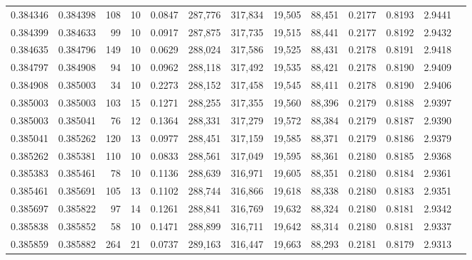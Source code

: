 \begin{tabular}{rrrrrrrrrrrrr}
0.384346 & 0.384398 &   108 &  10 &                                     0.0847 & 287,776 & 317,834 &  19,505 &  88,451 & 0.2177 & 0.8193 & 2.9441 \\
0.384399 & 0.384633 &    99 &  10 &                                     0.0917 & 287,875 & 317,735 &  19,515 &  88,441 & 0.2177 & 0.8192 & 2.9432 \\
0.384635 & 0.384796 &   149 &  10 &                                     0.0629 & 288,024 & 317,586 &  19,525 &  88,431 & 0.2178 & 0.8191 & 2.9418 \\
0.384797 & 0.384908 &    94 &  10 &                                     0.0962 & 288,118 & 317,492 &  19,535 &  88,421 & 0.2178 & 0.8190 & 2.9409 \\
0.384908 & 0.385003 &    34 &  10 &                                     0.2273 & 288,152 & 317,458 &  19,545 &  88,411 & 0.2178 & 0.8190 & 2.9406 \\
0.385003 & 0.385003 &   103 &  15 &                                     0.1271 & 288,255 & 317,355 &  19,560 &  88,396 & 0.2179 & 0.8188 & 2.9397 \\
0.385003 & 0.385041 &    76 &  12 &                                     0.1364 & 288,331 & 317,279 &  19,572 &  88,384 & 0.2179 & 0.8187 & 2.9390 \\
0.385041 & 0.385262 &   120 &  13 &                                     0.0977 & 288,451 & 317,159 &  19,585 &  88,371 & 0.2179 & 0.8186 & 2.9379 \\
0.385262 & 0.385381 &   110 &  10 &                                     0.0833 & 288,561 & 317,049 &  19,595 &  88,361 & 0.2180 & 0.8185 & 2.9368 \\
0.385383 & 0.385461 &    78 &  10 &                                     0.1136 & 288,639 & 316,971 &  19,605 &  88,351 & 0.2180 & 0.8184 & 2.9361 \\
0.385461 & 0.385691 &   105 &  13 &                                     0.1102 & 288,744 & 316,866 &  19,618 &  88,338 & 0.2180 & 0.8183 & 2.9351 \\
0.385697 & 0.385822 &    97 &  14 &                                     0.1261 & 288,841 & 316,769 &  19,632 &  88,324 & 0.2180 & 0.8181 & 2.9342 \\
0.385838 & 0.385852 &    58 &  10 &                                     0.1471 & 288,899 & 316,711 &  19,642 &  88,314 & 0.2180 & 0.8181 & 2.9337 \\
0.385859 & 0.385882 &   264 &  21 &                                     0.0737 & 289,163 & 316,447 &  19,663 &  88,293 & 0.2181 & 0.8179 & 2.9313 \\

\end{tabular}
